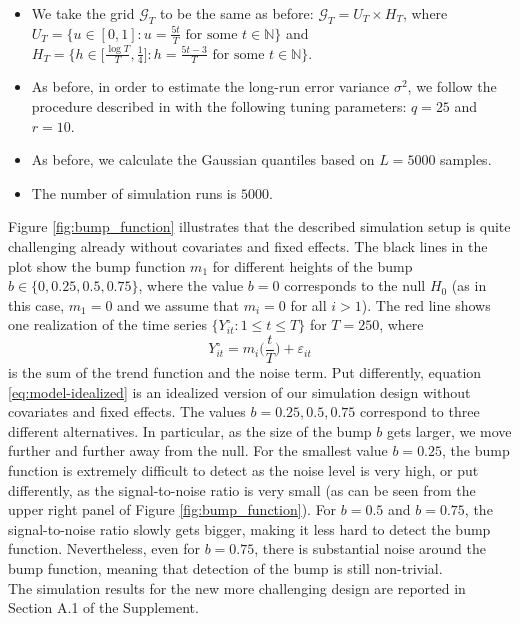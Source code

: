 \documentclass[a4paper,12pt]{article}
\begin{document}
\begin{enumerate}[label=\arabic*.,leftmargin=0.6cm]
\begin{enumerate}[label=(\roman*),leftmargin=0.75cm,topsep=0pt]
\begin{itemize}[leftmargin=0.45cm,itemsep=0pt,topsep=0pt]
\begin{figure}[t!]
\end{figure}

\item We take the grid $\mathcal{G}_T$ to be the same as before: $\mathcal{G}_T = U_T \times H_T$, where $U_T = \big\{ u \in [0,1]: u = \textstyle{\frac{5t}{T}} \text{ for some } t \in \mathbb{N} \big\}$ and $H_T = \big\{ h \in \big[ \textstyle{\frac{\log T}{T}}, \textstyle{\frac{1}{4}} \big]:  h = \textstyle{\frac{5t - 3}{T}} \text{ for some } t \in \mathbb{N} \big\}$.

\item As before, in order to estimate the long-run error variance $\sigma^2$, we follow the procedure described in \citet{KhismatullinaVogt2020} with the following tuning parameters: $q = 25$ and $r = 10$.

\item As before, we calculate the Gaussian quantiles based on $L = 5000$ samples. 

\item The number of simulation runs is $5000$. 

\end{itemize}

Figure \ref{fig:bump_function} illustrates that the described simulation setup is quite challenging already without covariates and fixed effects. The black lines in the plot show the bump function $m_1$ for different heights of the bump $b \in \{0, 0.25, 0.5, 0.75\}$, where the value $b=0$ corresponds to the null $H_0$ (as in this case, $m_1 = 0$ and we assume that $m_i = 0$ for all $i > 1$). The red line shows one realization of the time series $\{Y_{it}^\circ:1 \le t \le T \}$ for $T=250$, where 
\begin{equation}\label{eq:model-idealized}
Y_{it}^\circ = m_i\Big(\frac{t}{T}\Big) + \varepsilon_{it} 
\end{equation}
is the sum of the trend function and the noise term. Put differently, equation \eqref{eq:model-idealized} is an idealized version of our simulation design without covariates and fixed effects. The values $b=0.25,0.5,0.75$ correspond to three different alternatives. In particular, as the size of the bump $b$ gets larger, we move further and further away from the null. For the smallest value $b=0.25$, the bump function is extremely difficult to detect as the noise level is very high, or put differently, as the signal-to-noise ratio is very small (as can be seen from the upper right panel of Figure \ref{fig:bump_function}). For $b=0.5$ and $b=0.75$, the signal-to-noise ratio slowly gets bigger, making it less hard to detect the bump function. Nevertheless, even for $b=0.75$, there is substantial noise around the bump function, meaning that detection of the bump is still non-trivial. \\
The simulation results for the new more challenging design are reported in Section A.1 of the Supplement. 


\end{enumerate}
\end{enumerate}
\end{document}
